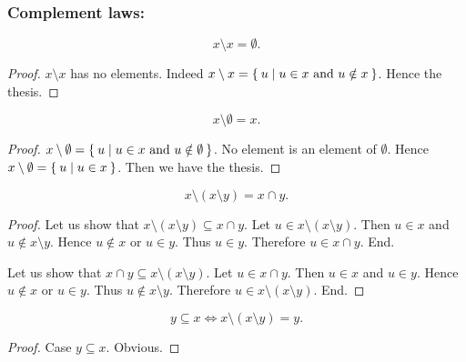 \documentclass[../../set-theory.ftl.tex]{subfiles}
\begin{document}
  \subsubsection*{Complement laws:}

  \begin{forthel}
    \begin{proposition}\label{SetTheory_01_01_402739}
      \[ x \setminus x = \emptyset. \]
    \end{proposition}
    \begin{proof}
      $x \setminus x$ has no elements.
      Indeed $x \setminus x = \Set{u | \text{$u \in x$ and $u \notin x$}}$.
      Hence the thesis.
    \end{proof}

    \begin{proposition}\label{SetTheory_01_01_661163}
      \[ x \setminus \emptyset = x. \]
    \end{proposition}
    \begin{proof}
      $x \setminus \emptyset = \Set{u | \text{$u \in x$ and $u \notin \emptyset$}}$.
      No element is an element of $\emptyset$.
      Hence $x \setminus \emptyset = \Set{u | u \in x}$.
      Then we have the thesis.
    \end{proof}

    \begin{proposition}\label{SetTheory_01_01_408438}
      \[ x \setminus (x \setminus y) = x \cap y. \]
    \end{proposition}
    \begin{proof}
      Let us show that $x \setminus (x \setminus y) \subseteq x \cap y$.
        Let $u \in x \setminus (x \setminus y)$.
        Then $u \in x$ and $u \notin x \setminus y$.
        Hence $u \notin x$ or $u \in y$.
        Thus $u \in y$.
        Therefore $u \in x \cap y$.
      End.

      Let us show that $x \cap y \subseteq x \setminus (x \setminus y)$.
        Let $u \in x \cap y$.
        Then $u \in x$ and $u \in y$.
        Hence $u \notin x$ or $u \in y$.
        Thus $u \notin x \setminus y$.
        Therefore $u \in x \setminus (x \setminus y)$.
      End.
    \end{proof}

    \begin{proposition}\label{SetTheory_01_01_185130}
      \[ y \subseteq x \iff x \setminus (x \setminus y) = y. \]
    \end{proposition}
    \begin{proof}
      Case $y \subseteq x$. Obvious.


\end{proof}
\end{forthel}
\end{document}
